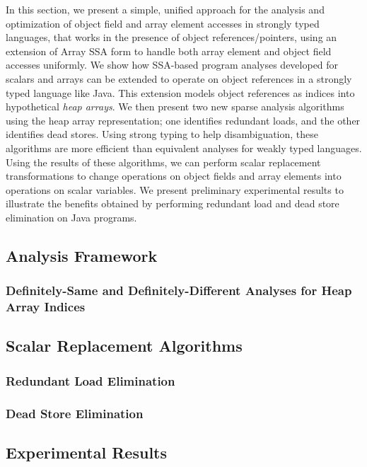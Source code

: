 In this section, we present a simple, unified approach for the analysis and
optimization of 
object field and array element accesses in strongly typed languages, 
that works in the presence of
object references/pointers, using an extension of Array SSA form to handle both array element and object field accesses 
uniformly.
We show how SSA-based program
analyses developed for scalars and arrays can be extended to
operate on object references in a strongly typed language like Java.
This extension models object references as
indices into hypothetical {\em heap arrays}.
We then present two new sparse analysis
algorithms using
the heap array representation; one identifies redundant loads, and the
other identifies dead stores.
Using strong typing to help disambiguation, these algorithms are
more efficient than equivalent analyses for weakly typed languages.
Using the results of these algorithms, we can perform scalar replacement
transformations to change operations on object fields
and array elements into operations on scalar
variables.  We present preliminary experimental results to illustrate the benefits obtained by
performing redundant load and dead store elimination on Java
programs.  


\subsection{Analysis Framework}\label{model}

\subsubsection{ Definitely-Same and Definitely-Different Analyses for Heap Array Indices}\label{svalnum}

\subsection{Scalar Replacement Algorithms}
\label{scalrep}

\subsubsection{Redundant Load Elimination}
\label{alg}

\subsubsection{Dead Store Elimination}\label{store}

\subsection{Experimental Results}\label{results}
